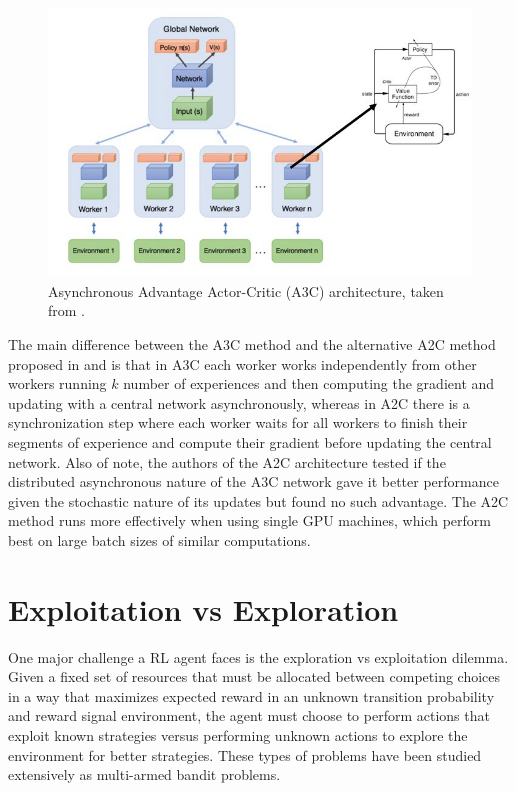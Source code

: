 \begin{figure}[h]
  \centering
  \includegraphics[width=\textwidth]{images/A3C.png}
  \caption{Asynchronous Advantage Actor-Critic (A3C) architecture, taken from \cite{A3CImag}.} \label{A3CImag}
\end{figure}

The main difference between the \acrshort{A3C} method and the alternative \acrshort{A2C} method proposed in \cite{openaia2c} and \cite{a2c} is that in \acrshort{A3C} each worker works independently from other workers running $k$ number of experiences and then computing the gradient and updating with a central network asynchronously, whereas in \acrshort{A2C} there is a synchronization step where each worker waits for all workers to finish their segments of experience and compute their gradient before updating the central network. Also of note, the authors of the \acrshort{A2C} architecture tested if the distributed asynchronous nature of the \acrshort{A3C} network gave it better performance given the stochastic nature of its updates but found no such advantage. The \acrshort{A2C} method runs more effectively when using single \acrshort{GPU} machines, which perform best on large batch sizes of similar computations.


\section{Exploitation vs Exploration} \label{section:EE}
\noindent One major challenge a \acrshort{RL} agent faces is the exploration vs exploitation dilemma. Given a fixed set of resources that must be allocated between competing choices in a way that maximizes expected reward in an unknown transition probability and reward signal environment, the agent must choose to perform actions that exploit known strategies versus performing unknown actions to explore the environment for better strategies. These types of problems have been studied extensively as multi-armed bandit problems.

